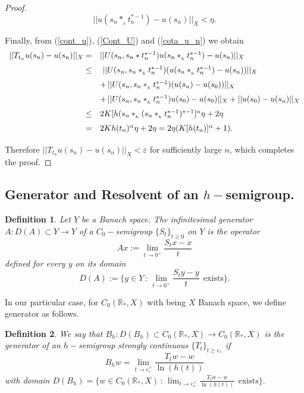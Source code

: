 \documentclass[10pt]{amsart}
\newtheorem{definition}{Definition}
\numberwithin{equation}{section}
\begin{document}
\begin{proof}
\begin{equation}\label{cota_u_n}
||u(s_n*_{_h}t_n^{*-1}) - u(s_n)||_X < \eta.
\end{equation}


Finally, from (\ref{cont_u}), (\ref{Cont_U}) and (\ref{cota_u_n}) we obtain
$$
\begin{array}{rl}
\medskip
    ||T_{t_n}u(s_n) - u(s_n)||_X = & ||U(s_n, s_n*t_n^{*-1}) u(s_n*_{_h} t_n^{*-1}) - u(s_n)||_X \\
    \medskip
    \le & \  ||U(s_n, s_n*_{_h}t_n^{*-1}) (u(s_n*_{_h}t_n^{*-1}) - u(s_n))||_X \\
    \medskip
     &  + \, ||U(s_n, s_n*_{_h} t_n^{*-1})( u(s_n) - u(s_0))||_X  \\  
\medskip
     &  + \, ||U(s_n, s_n*_{_h}t_n^{*-1}) u(s_0) - u(s_0)||_X   +  || u(s_0) - u(s_n)||_X  \\  
\medskip
\le & 2K [h(s_n*_{_h}(s_n*_{_h}t_n^{*-1})^{*-1}]^\alpha \eta + 2 \eta \\
\medskip
= & 2 K h(t_n)^\alpha \eta + 2 \eta = 2 \eta ( K [h(t_n)]^\alpha +   1) .  \end{array}
$$
Therefore $||T_{t_n}u(s_n) - u(s_n)||_X < \varepsilon$ for sufficiently large $n$, which completes the proof.
\end{proof}






\subsection{Generator and Resolvent of an $h-$semigroup.}



\begin{definition}\label{generadorA}
Let $Y$ be a Banach space. The  infinitesimal generator $A:D(A)\subset Y \to Y$ of a $C_0-$semigroup $\{S_t\}_{t \ge 0}$ on $Y$  is the operator 
$$
Ax := \lim_{t \to 0^+} \frac{S_t x - x}{t}
$$
defined for every $y$ on its domain 
$$
D(A) := \{y \in Y \, : \, \lim_{t \to 0^+} \frac{S_t y - y}{t}  \ \ \mbox{exists}\}.
$$
\end{definition}

In our particular case, for $C_0(\mathbb{R}_*, X)$ with being $X$ Banach space, we define generator as follows.

\begin{definition}\label{generadorB}
We say that $B_h:D(B_h) \subset C_0(\mathbb{R}_*, X) \to C_0(\mathbb{R}_*, X)$ is the  generator of an $h-$semigroup strongly continuous $\{T_t\}_{t \ge e_*}$ if
$$
B_h w = \lim_{t \to e_ *^+} \frac{T_t w -  w}{\ln(h(t))}
$$
with  domain 
$
D(B_h) = \displaystyle  \{w \in C_0(\mathbb{R}_*, X) \, : \, \lim_{t \to e_*^+} \frac{T_t w - w}{\ln(h(t))}  \ \ \mbox{exists}\}.
$
\end{definition}
\end{document}
